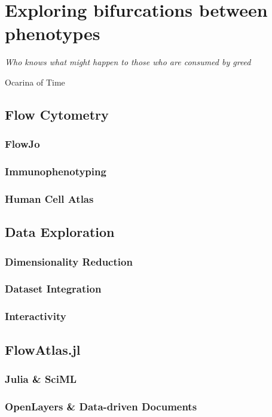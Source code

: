 \chapter{Exploring bifurcations between phenotypes}
\label{chapter:exploring}
\epigraph{\textit{Who knows what might happen to those who are consumed by greed}}{Ocarina of Time}

\section{Flow Cytometry}

\subsection{FlowJo}
\subsection{Immunophenotyping}
\subsection{Human Cell Atlas}

\section{Data Exploration}

\subsection{Dimensionality Reduction}
\subsection{Dataset Integration}
\subsection{Interactivity}

\section{FlowAtlas.jl}

\subsection{Julia \& SciML}
\subsection{OpenLayers \& Data-driven Documents}